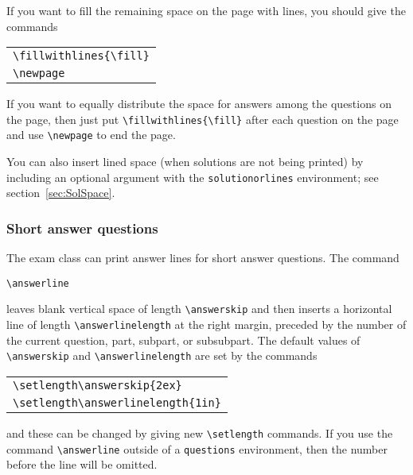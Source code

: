 \documentclass[12pt]{exam}
\begin{document}
\medskip

If you want to fill the remaining space on the page with lines, you
should give the commands
\begin{center}
  \begin{tabular}{l}
    \verb"\fillwithlines{\fill}"\\
    \verb"\newpage"
  \end{tabular}
\end{center}
If you want to equally distribute the space for answers among the
questions on the page, then just put \verb"\fillwithlines{\fill}"
after each question on the page and use \verb"\newpage" to end the
page.

You can also insert lined space (when solutions are not being printed)
by including an optional argument with the \verb"solutionorlines"
environment; see section~\ref{sec:SolSpace}.

\subsubsection{Short answer questions}
\label{sec:ShortAns}


The exam class can print answer lines for short answer questions.  The
command
\begin{center}
  \verb"\answerline"
\end{center}
leaves blank vertical space of length \verb"\answerskip" and then
inserts a horizontal line of length \verb"\answerlinelength" at the
right margin, preceded by the number of the current question, part,
subpart, or subsubpart.  The default values of \verb"\answerskip" and
\verb"\answerlinelength" are set by the commands
\begin{center}
  \begin{tabular}{l}
    \verb"\setlength\answerskip{2ex}"\\
    \verb"\setlength\answerlinelength{1in}"
  \end{tabular}
\end{center}
and these can be changed by giving new \verb"\setlength" commands.
If you use the command \verb"\answerline" outside of a
\verb"questions" environment, then the number before the line will be
omitted.
\end{document}

